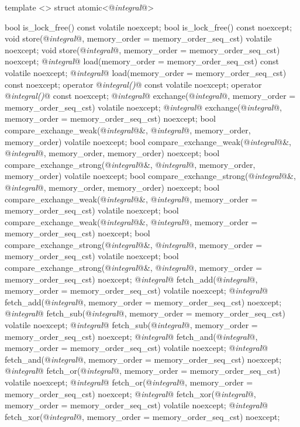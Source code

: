 \begin{codeblock}
{  template <> struct atomic<@\textit{integral}@> {
    bool is_lock_free() const volatile noexcept;
    bool is_lock_free() const noexcept;
    void store(@\textit{integral}@, memory_order = memory_order_seq_cst) volatile noexcept;
    void store(@\textit{integral}@, memory_order = memory_order_seq_cst) noexcept;
    @\textit{integral}@ load(memory_order = memory_order_seq_cst) const volatile noexcept;
    @\textit{integral}@ load(memory_order = memory_order_seq_cst) const noexcept;
    operator @\textit{integral()}@ const volatile noexcept;
    operator @\textit{integral()}@ const noexcept;
    @\textit{integral}@ exchange(@\textit{integral}@, memory_order = memory_order_seq_cst) volatile noexcept;
    @\textit{integral}@ exchange(@\textit{integral}@, memory_order = memory_order_seq_cst) noexcept;
    bool compare_exchange_weak(@\textit{integral}@&, @\textit{integral}@, memory_order, memory_order) volatile noexcept;
    bool compare_exchange_weak(@\textit{integral}@&, @\textit{integral}@, memory_order, memory_order) noexcept;
    bool compare_exchange_strong(@\textit{integral}@&, @\textit{integral}@, memory_order, memory_order) volatile noexcept;
    bool compare_exchange_strong(@\textit{integral}@&, @\textit{integral}@, memory_order, memory_order) noexcept;
    bool compare_exchange_weak(@\textit{integral}@&, @\textit{integral}@, memory_order = memory_order_seq_cst) volatile noexcept;
    bool compare_exchange_weak(@\textit{integral}@&, @\textit{integral}@, memory_order = memory_order_seq_cst) noexcept;
    bool compare_exchange_strong(@\textit{integral}@&, @\textit{integral}@, memory_order = memory_order_seq_cst) volatile noexcept;
    bool compare_exchange_strong(@\textit{integral}@&, @\textit{integral}@, memory_order = memory_order_seq_cst) noexcept;
    @\textit{integral}@ fetch_add(@\textit{integral}@, memory_order = memory_order_seq_cst) volatile noexcept;
    @\textit{integral}@ fetch_add(@\textit{integral}@, memory_order = memory_order_seq_cst) noexcept;
    @\textit{integral}@ fetch_sub(@\textit{integral}@, memory_order = memory_order_seq_cst) volatile noexcept;
    @\textit{integral}@ fetch_sub(@\textit{integral}@, memory_order = memory_order_seq_cst) noexcept;
    @\textit{integral}@ fetch_and(@\textit{integral}@, memory_order = memory_order_seq_cst) volatile noexcept;
    @\textit{integral}@ fetch_and(@\textit{integral}@, memory_order = memory_order_seq_cst) noexcept;
    @\textit{integral}@ fetch_or(@\textit{integral}@, memory_order = memory_order_seq_cst) volatile noexcept;
    @\textit{integral}@ fetch_or(@\textit{integral}@, memory_order = memory_order_seq_cst) noexcept;
    @\textit{integral}@ fetch_xor(@\textit{integral}@, memory_order = memory_order_seq_cst) volatile noexcept;
    @\textit{integral}@ fetch_xor(@\textit{integral}@, memory_order = memory_order_seq_cst) noexcept;

}}
\end{codeblock}
